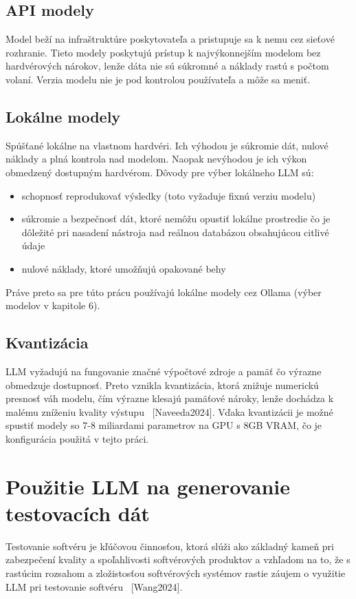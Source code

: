 \subsection{API modely}
Model beží na infraštruktúre poskytovateľa a pristupuje sa k nemu cez sieťové rozhranie. Tieto modely poskytujú prístup k najvýkonnejším modelom bez hardvérových nárokov, lenže dáta nie sú súkromné a náklady rastú s počtom volaní. Verzia modelu nie je pod kontrolou používateľa a  môže sa meniť.

\subsection{Lokálne modely}
Spúšťané lokálne na vlastnom hardvéri. Ich výhodou je súkromie dát, nulové náklady a plná kontrola nad modelom. Naopak nevýhodou je ich výkon obmedzený dostupným hardvérom. Dôvody pre výber lokálneho LLM sú:

\begin{itemize}
    \item schopnosť reprodukovať výsledky (toto vyžaduje fixnú verziu modelu)
    \item súkromie a bezpečnosť dát, ktoré nemôžu opustiť lokálne prostredie čo je dôležité pri nasadení nástroja nad reálnou databázou obsahujúcou citlivé údaje
    \item nulové náklady, ktoré umožňujú opakované behy
\end{itemize}

Práve preto sa pre túto prácu používajú lokálne modely cez Ollama (výber modelov v kapitole 6).

\subsection{Kvantizácia}

LLM vyžadujú na fungovanie značné výpočtové zdroje a pamäť čo výrazne obmedzuje dostupnosť. Preto vznikla kvantizácia, ktorá znižuje numerickú presnosť váh modelu, čím výrazne klesajú pamäťové nároky, lenže dochádza k malému zníženiu kvality výstupu~\cite{} [Naveeda2024]. Vďaka kvantizácii je možné spustiť modely so 7-8 miliardami parametrov na GPU s 8GB VRAM, čo je konfigurácia použitá v tejto práci.

\section{Použitie LLM na generovanie testovacích dát}

Testovanie softvéru je kľúčovou činnosťou, ktorá slúži ako základný kameň pri zabezpečení kvality a spoľahlivosti softvérových produktov a vzhľadom na to, že s rastúcim rozsahom a zložistosťou softvérových systémov rastie záujem o využitie LLM pri testovanie softvéru~\cite{} [Wang2024].


